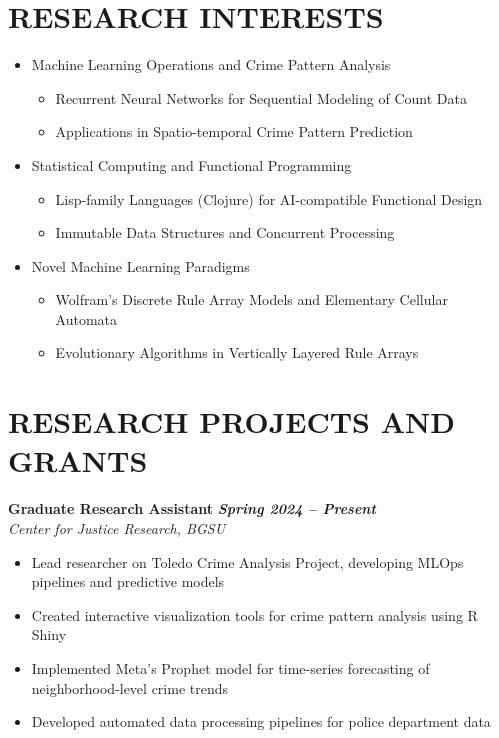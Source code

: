 \documentclass[11pt,letterpaper]{article}
\begin{document}
\section{RESEARCH INTERESTS}
\begin{itemize}
    \item Machine Learning Operations and Crime Pattern Analysis
        \begin{itemize}
            \item Recurrent Neural Networks for Sequential Modeling of Count Data
            \item Applications in Spatio-temporal Crime Pattern Prediction
        \end{itemize}
    \item Statistical Computing and Functional Programming
        \begin{itemize}
            \item Lisp-family Languages (Clojure) for AI-compatible Functional Design
            \item Immutable Data Structures and Concurrent Processing
        \end{itemize}
    \item Novel Machine Learning Paradigms
        \begin{itemize}
            \item Wolfram's Discrete Rule Array Models and Elementary Cellular Automata
            \item Evolutionary Algorithms in Vertically Layered Rule Arrays
        \end{itemize}
\end{itemize}

\section{RESEARCH PROJECTS AND GRANTS}

\textbf{Graduate Research Assistant} \hfill \textbf{\textit{Spring 2024 -- Present}} \\
\textit{Center for Justice Research, BGSU}
\begin{itemize}
    \item Lead researcher on Toledo Crime Analysis Project, developing MLOps pipelines and predictive models
    \item Created interactive visualization tools for crime pattern analysis using R Shiny
    \item Implemented Meta's Prophet model for time-series forecasting of neighborhood-level crime trends
    \item Developed automated data processing pipelines for police department data
\end{itemize}
\end{document}
